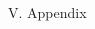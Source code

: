 \documentclass{article}
\begin{document}
\begin{multicols*}{2}


\begin{center}
{\large V. Appendix}
\end{center}

\end{multicols*}













\end{document}
